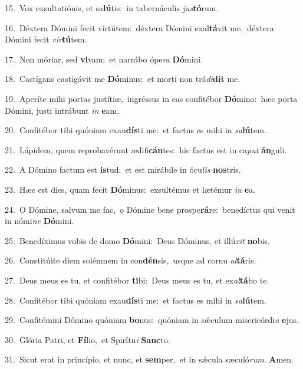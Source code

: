 {\numbfont\textcolor{\numbcolor}{15.}}~Vox exsultatiónis, et sa\-\textbf{lú}\-tis:~\star in tabernáculis \textit{jus}\-\textbf{tó}rum.\par
{\numbfont\textcolor{\numbcolor}{16.}}~Déxtera Dómini fecit virtútem:~\dagger déxtera Dómini exal\-\textbf{tá}\-vit me,~\star déxtera Dómini fecit \textit{vir}\-\textbf{tú}tem.\par
{\numbfont\textcolor{\numbcolor}{17.}}~Non móriar, sed \textbf{vi}\-vam:~\star et narrábo ópe\textit{ra} \textbf{Dó}\-mini.\par
{\numbfont\textcolor{\numbcolor}{18.}}~Castígans castigávit me \textbf{Dó}\-minus:~\star et morti non trá\-\textit{di}\-\textbf{dit} me.\par
{\numbfont\textcolor{\numbcolor}{19.}}~Aperíte mihi portas justítiæ,~\dagger ingréssus in eas confitébor \textbf{Dó}\-mino:~\star hæc porta Dómini, justi intrábunt \textit{in} \textbf{e}\-am.\par
{\numbfont\textcolor{\numbcolor}{20.}}~Confitébor tibi quóniam exau\-\textbf{dís}\-ti me:~\star et factus es mihi in \textit{sa}\-\textbf{lú}tem.\par
{\numbfont\textcolor{\numbcolor}{21.}}~Lápidem, quem reprobavérunt ædifi\-\textbf{cán}\-tes:~\star hic factus est in ca\textit{put} \textbf{án}\-guli.\par
{\numbfont\textcolor{\numbcolor}{22.}}~A Dómino factum est \textbf{is}\-tud:~\star et est mirábile in ócu\textit{lis} \textbf{nos}\-tris.\par
{\numbfont\textcolor{\numbcolor}{23.}}~Hæc est dies, quam fecit \textbf{Dó}\-minus:~\star exsultémus et lætémur \textit{in} \textbf{e}\-a.\par
{\numbfont\textcolor{\numbcolor}{24.}}~O Dómine, salvum me fac,~\dagger o Dómine bene prospe\-\textbf{rá}\-re:~\star benedíctus qui venit in nómi\textit{ne} \textbf{Dó}\-mini.\par
{\numbfont\textcolor{\numbcolor}{25.}}~Benedíximus vobis de domo \textbf{Dó}\-mini:~\star Deus Dóminus, et illú\textit{xit} \textbf{no}\-bis.\par
{\numbfont\textcolor{\numbcolor}{26.}}~Constitúite diem solémnem in con\-\textbf{dén}\-sis,~\star usque ad cornu \textit{al}\-\textbf{tá}ris.\par
{\numbfont\textcolor{\numbcolor}{27.}}~Deus meus es tu, et confitébor \textbf{ti}\-bi:~\star Deus meus es tu, et ex\-\textit{al}\-\textbf{tá}bo te.\par
{\numbfont\textcolor{\numbcolor}{28.}}~Confitébor tibi quóniam exau\-\textbf{dís}\-ti me:~\star et factus es mihi in \textit{sa}\-\textbf{lú}tem.\par
{\numbfont\textcolor{\numbcolor}{29.}}~Confitémini Dómino quóniam \textbf{bo}\-nus:~\star quóniam in sǽculum misericórdi\textit{a} \textbf{e}\-jus.\par
{\numbfont\textcolor{\numbcolor}{30.}}~Glória Patri, et \textbf{Fí}\-lio,~\star et Spirítu\textit{i} \textbf{Sanc}\-to.\par
{\numbfont\textcolor{\numbcolor}{31.}}~Sicut erat in princípio, et nunc, et \textbf{sem}\-per,~\star et in sǽcula sæculó\-\textit{rum}\-. \textbf{A}\-men.\par
